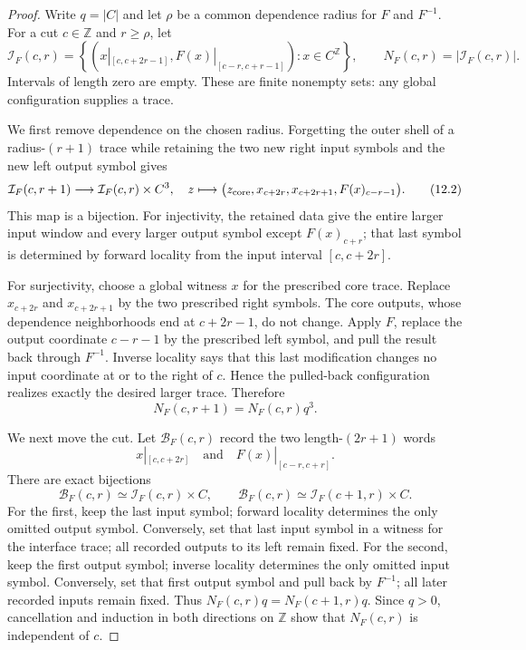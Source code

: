 \documentclass[11pt]{article}
\theoremstyle{definition}
\theoremstyle{remark}
\begin{document}
\begin{proof}
Write $q=|C|$ and let $\rho$ be a common dependence radius for $F$ and
$F^{-1}$.  For a cut $c\in\mathbb Z$ and $r\ge\rho$, let
\[
 \mathcal I_F(c,r)=\left\{
 \left(x|_{[c,c+2r-1]},F(x)|_{[c-r,c+r-1]}\right):
 x\in C^{\mathbb Z}\right\},
 \qquad N_F(c,r)=|\mathcal I_F(c,r)|.                       \tag{12.1}
\]
Intervals of length zero are empty.  These are finite nonempty sets: any
global configuration supplies a trace.

We first remove dependence on the chosen radius.  Forgetting the outer shell
of a radius-$(r+1)$ trace while retaining the two new right input symbols and
the new left output symbol gives
\[
 \mathcal I_F(c,r+1)\longrightarrow
 \mathcal I_F(c,r)\times C^3,
 \quad z\longmapsto
 \bigl(z_{\rm core},x_{c+2r},x_{c+2r+1},F(x)_{c-r-1}\bigr). \tag{12.2}
\]
This map is a bijection.  For injectivity, the retained data give the entire
larger input window and every larger output symbol except $F(x)_{c+r}$; that
last symbol is determined by forward locality from the input interval
$[c,c+2r]$.

For surjectivity, choose a global witness $x$ for the prescribed core trace.
Replace $x_{c+2r}$ and $x_{c+2r+1}$ by the two prescribed right symbols.
The core outputs, whose dependence neighborhoods end at $c+2r-1$, do not
change.  Apply $F$, replace the output coordinate $c-r-1$ by the prescribed
left symbol, and pull the result back through $F^{-1}$.  Inverse locality says
that this last modification changes no input coordinate at or to the right of
$c$.  Hence the pulled-back configuration realizes exactly the desired
larger trace.  Therefore
\[
                     N_F(c,r+1)=N_F(c,r)q^3.
\]

We next move the cut.  Let $\mathcal B_F(c,r)$ record the two length-$(2r+1)$
words
\[
 x|_{[c,c+2r]}\quad\text{and}\quad F(x)|_{[c-r,c+r]}.
\]
There are exact bijections
\[
 \mathcal B_F(c,r)\simeq\mathcal I_F(c,r)\times C,
 \qquad
 \mathcal B_F(c,r)\simeq\mathcal I_F(c+1,r)\times C.       \tag{12.3}
\]
For the first, keep the last input symbol; forward locality determines the
only omitted output symbol.  Conversely, set that last input symbol in a
witness for the interface trace; all recorded outputs to its left remain fixed.
For the second, keep the first output symbol; inverse locality determines the
only omitted input symbol.  Conversely, set that first output symbol and pull
back by $F^{-1}$; all later recorded inputs remain fixed.  Thus
$N_F(c,r)q=N_F(c+1,r)q$.  Since $q>0$, cancellation and induction in both
directions on $\mathbb Z$ show that $N_F(c,r)$ is independent of $c$.


\end{proof}
\end{document}
